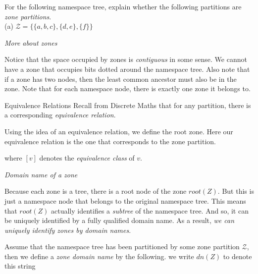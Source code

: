 \frmrule 

\begin{example}
For the following namespace tree, explain whether the following partitions 
are \textit{zone partitions}. \\
(a) $\mathcal{Z} = \{\{a,b,c\},\{d,e\},\{f\}\}$
\end{example}


\frmrule

\textit{More about zones}

Notice that the space occupied by zones is \textit{contiguous} in some sense. 
We cannot have a zone that occupies bits dotted around the namespace 
tree. Also note that if a zone has two nodes, then the 
least common ancestor must also be in the zone. 
Note that for each namespace node, there is exactly 
one zone it belongs to. 

\begin{sidenote}{Equivalence Relations} 
Recall from Discrete Maths that for any partition, 
there is a corresponding \textit{equivalence relation}.
\end{sidenote}

Using the idea of an equivalence relation, we define the root zone.
Here our equivalence relation is the one that corresponds to the 
zone partition.

where $[v]$ denotes the \textit{equivalence class} of $v$. 



\frmrule 

\textit{Domain name of a zone}

Because each zone is a tree, there is a root node of the zone $root(Z)$. 
But this is just a namespace node that belongs to the 
original namespace tree. This means that $root(Z)$ actually 
identifies a \textit{subtree} of the namespace tree.
And so, it can be uniquely 
identified by a fully qualified domain name. As a result, 
\textit{we can uniquely identify zones by domain names}. 

Assume that the namespace tree has been partitioned by some zone partition $\mathcal{Z}$, then
we define a \textit{zone domain name} by the following.
we write $dn(Z)$ to denote this string

